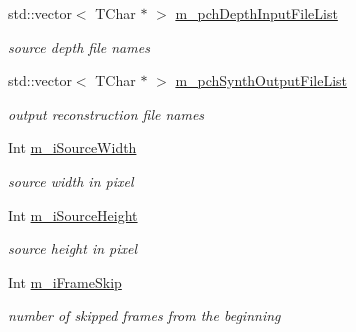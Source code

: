 \begin{DoxyCompactItemize}
std\+::vector$<$ T\+Char $\ast$ $>$ \hyperlink{class_t_app_renderer_cfg_a09f816330c996f70000b5a5f40b0d3d7}{m\+\_\+pch\+Depth\+Input\+File\+List}
\begin{DoxyCompactList}\small\item\em source depth file names \end{DoxyCompactList}\item 
\mbox{\label{class_t_app_renderer_cfg_ae9e31f6ae25990807ced39cc05d9a972}} 
std\+::vector$<$ T\+Char $\ast$ $>$ \hyperlink{class_t_app_renderer_cfg_ae9e31f6ae25990807ced39cc05d9a972}{m\+\_\+pch\+Synth\+Output\+File\+List}
\begin{DoxyCompactList}\small\item\em output reconstruction file names \end{DoxyCompactList}\item 
\mbox{\label{class_t_app_renderer_cfg_abdd435caba311d035cea4aae1257498a}} 
Int \hyperlink{class_t_app_renderer_cfg_abdd435caba311d035cea4aae1257498a}{m\+\_\+i\+Source\+Width}
\begin{DoxyCompactList}\small\item\em source width in pixel \end{DoxyCompactList}\item 
\mbox{\label{class_t_app_renderer_cfg_abf50afdf6783b60e3d7b9b1ddefae099}} 
Int \hyperlink{class_t_app_renderer_cfg_abf50afdf6783b60e3d7b9b1ddefae099}{m\+\_\+i\+Source\+Height}
\begin{DoxyCompactList}\small\item\em source height in pixel \end{DoxyCompactList}\item 
\mbox{\label{class_t_app_renderer_cfg_aefafa77a195b1f4c254e3edd64b400d7}} 
Int \hyperlink{class_t_app_renderer_cfg_aefafa77a195b1f4c254e3edd64b400d7}{m\+\_\+i\+Frame\+Skip}
\begin{DoxyCompactList}\small\item\em number of skipped frames from the beginning \end{DoxyCompactList}\item 
\mbox{\label{class_t_app_renderer_cfg_afff9fec6eb3139afb11f9322cac34cc3}} 

\end{DoxyCompactItemize}
